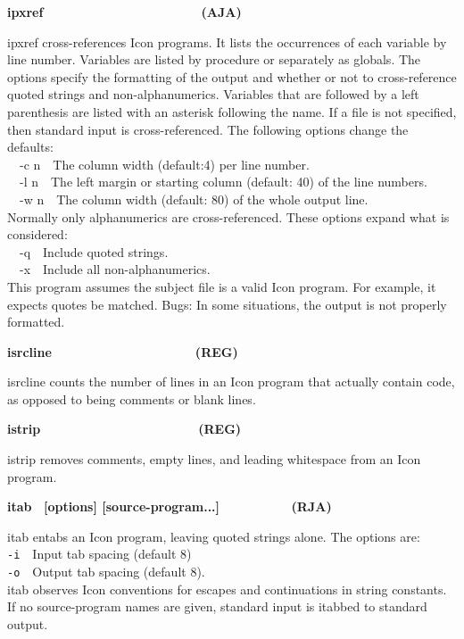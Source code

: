 {\sffamily\bfseries
ipxref\ \ \ \ \ \ \ \ \ \ \ \ \ \ \ \ \ \ \ \ \ \ (AJA)}

\textsf{ipxref} cross-references Icon programs.
It lists the occurrences of each variable by line number. Variables are
listed by procedure or separately as globals. The options specify the
formatting of the output and whether or not to cross-reference quoted
strings and non-alphanumerics. Variables that are followed by a left
parenthesis are listed with an asterisk following the name. If a file
is not specified, then standard input is cross-referenced. The
following options change the defaults:\\
\ \ \textsf{{}-c n}\ \ The column width (default:4) per line
number.\\
\ \ \textsf{{}-l n}\ \ The left margin or starting column (default: 40)
of the line numbers.\\
\ \ \textsf{{}-w n}\ \ The column width (default: 80) of the whole
output line.\\
Normally only alphanumerics are cross-referenced. These options expand
what is considered:\\
\ \ \textsf{{}-q}\ \ Include quoted strings.\\
\ \ \textsf{{}-x}\ \ Include all non-alphanumerics.\\
This program assumes the subject file is a valid Icon program. For
example, it expects quotes be matched. Bugs: In some situations, the
output is not properly formatted.

{\sffamily\bfseries
isrcline\ \ \ \ \ \ \ \ \ \ \ \ \ \ \ \ \ \ \ \ (REG)}

\textsf{isrcline} counts the number of lines in an Icon program that
actually contain code, as opposed to being comments or blank lines.

{\sffamily\bfseries
istrip\ \ \ \ \ \ \ \ \ \ \ \ \ \ \ \ \ \ \ \ \ \ (REG)}

\textsf{istrip} removes comments, empty lines, and leading whitespace
from an Icon program.

{\sffamily\bfseries
itab \ \textrm{\textmd{[options]
[source-program...]\ \ \ \ \ \ \ \ \ \ }}(RJA)}

\textsf{itab} entabs an Icon program, leaving quoted strings alone. The
options are:\\
\texttt{{}-i}\ \ Input tab spacing (default 8)\\
\texttt{{}-o}\ \ Output tab spacing (default 8).\\
\textsf{itab} observes Icon conventions for escapes and continuations in
string constants. If no source-program names are given, standard input
is {\textquotedbl}itabbed{\textquotedbl} to standard output.

